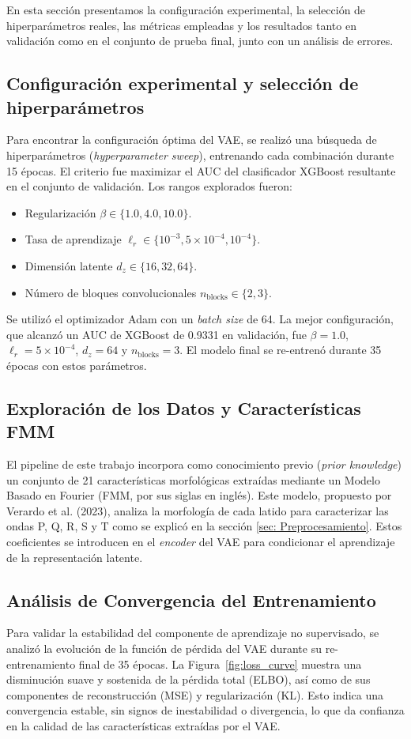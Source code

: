 \documentclass[11pt]{article}
\begin{document}
En esta sección presentamos la configuración experimental, la selección de hiperparámetros reales, las métricas empleadas y los resultados tanto en validación como en el conjunto de prueba final, junto con un análisis de errores.

\subsection{Configuración experimental y selección de hiperparámetros}
Para encontrar la configuración óptima del VAE, se realizó una búsqueda de hiperparámetros (\textit{hyperparameter sweep}), entrenando cada combinación durante 15 épocas. El criterio fue maximizar el AUC del clasificador XGBoost resultante en el conjunto de validación. Los rangos explorados fueron:
\begin{itemize}
    \item Regularización $\beta\in\{1.0, 4.0, 10.0\}$.
    \item Tasa de aprendizaje $\ell_r\in\{10^{-3}, 5\times10^{-4}, 10^{-4}\}$.
    \item Dimensión latente $d_z\in\{16, 32, 64\}$.
    \item Número de bloques convolucionales $n_{\mathrm{blocks}}\in\{2, 3\}$.
\end{itemize}
Se utilizó el optimizador Adam con un \textit{batch size} de 64. La mejor configuración, que alcanzó un AUC de XGBoost de 0.9331 en validación, fue $\beta=1.0$, $\ell_r=5\times10^{-4}$, $d_z=64$ y $n_{\mathrm{blocks}}=3$. El modelo final se re-entrenó durante 35 épocas con estos parámetros.

\subsection{Exploración de los Datos y Características FMM}
El pipeline de este trabajo incorpora como conocimiento previo (\textit{prior knowledge}) un conjunto de 21 características morfológicas extraídas mediante un Modelo Basado en Fourier (FMM, por sus siglas en inglés). Este modelo, propuesto por Verardo et al. (2023), analiza la morfología de cada latido para caracterizar las ondas P, Q, R, S y T como se explicó en la sección \ref{sec: Preprocesamiento}.
Estos coeficientes se introducen en el \textit{encoder} del VAE para condicionar el aprendizaje de la representación latente.

\vspace{3em}
\subsection{Análisis de Convergencia del Entrenamiento}
Para validar la estabilidad del componente de aprendizaje no supervisado, se analizó la evolución de la función de pérdida del VAE durante su re-entrenamiento final de 35 épocas. La Figura~\ref{fig:loss_curve} muestra una disminución suave y sostenida de la pérdida total (ELBO), así como de sus componentes de reconstrucción (MSE) y regularización (KL). Esto indica una convergencia estable, sin signos de inestabilidad o divergencia, lo que da confianza en la calidad de las características extraídas por el VAE.
\end{document}
